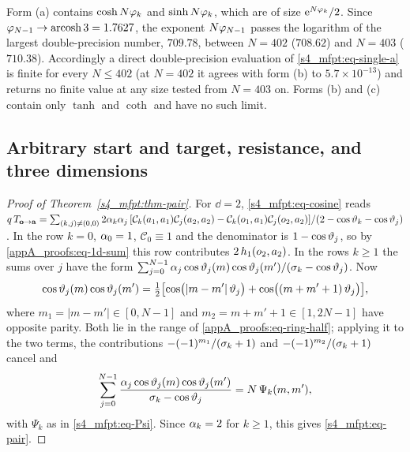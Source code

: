 \begin{remark}
Form (a) contains $\cosh N\varphi_{k}$ and $\sinh N\varphi_{k}$, which are of size $\mathrm{e}^{N\varphi_{k}}/2$. Since
$\varphi_{N-1}\to\operatorname{arcosh}3=1.7627$, the exponent $N\varphi_{N-1}$ passes the logarithm of the largest double-precision
number, $709.78$, between $N=402$ ($708.62$) and $N=403$ ($710.38$). Accordingly a direct double-precision
evaluation of \eqref{s4_mfpt:eq-single-a} is finite for every $N\le402$ (at $N=402$ it agrees with form (b) to
$5.7\times10^{-13}$) and returns no finite value at any size tested from $N=403$ on.
Forms (b) and (c) contain only $\tanh$ and $\coth$ and have no such limit.
\end{remark}

\subsection{Arbitrary start and target, resistance, and three dimensions}

\begin{proof}[Proof of Theorem~\ref{s4_mfpt:thm-pair}]
For $\dd=2$, \eqref{s4_mfpt:eq-cosine} reads
$q\,T_{\mathbf{o}\to\mathbf{a}}=\sum_{(k,j)\ne(0,0)}2\alpha_{k}\alpha_{j}\,[\mathcal C_k(a_1,a_1)\mathcal C_j(a_2,a_2)-\mathcal C_k(o_1,a_1)\mathcal C_j(o_2,a_2)]/(2-\cos\vartheta_{k}-\cos\vartheta_{j})$.
In the row $k=0$, $\alpha_{0}=1$, $\mathcal C_0\equiv1$ and the denominator is $1-\cos\vartheta_{j}$, so by
\eqref{appA_proofs:eq-1d-sum} this row contributes $2\,h_{1}(o_2,a_2)$. In the rows $k\ge1$ the sums over $j$ have
the form $\sum_{j=0}^{N-1}\alpha_{j}\cos\vartheta_{j}(m)\cos\vartheta_{j}(m')/(\sigma_{k}-\cos\vartheta_{j})$. Now
\begin{equation}\label{appA_proofs:eq-prod}
  \cos\vartheta_{j}(m)\cos\vartheta_{j}(m')=\tfrac12\bigl[\cos\bigl(|m-m'|\,\vartheta_{j}\bigr)+\cos\bigl((m+m'+1)\,\vartheta_{j}\bigr)\bigr],
\end{equation}
where $m_1=|m-m'|\in[0,N-1]$ and $m_2=m+m'+1\in[1,2N-1]$ have opposite parity. Both lie in the range of
\eqref{appA_proofs:eq-ring-half}; applying it to the two terms, the contributions $-(-1)^{m_1}/(\sigma_{k}+1)$ and
$-(-1)^{m_2}/(\sigma_{k}+1)$ cancel and
\begin{equation}\label{appA_proofs:eq-inner-pair}
  \sum_{j=0}^{N-1}\frac{\alpha_{j}\cos\vartheta_{j}(m)\cos\vartheta_{j}(m')}{\sigma_{k}-\cos\vartheta_{j}}=N\,\Psi_k(m,m'),
\end{equation}
with $\Psi_k$ as in \eqref{s4_mfpt:eq-Psi}. Since $\alpha_{k}=2$ for $k\ge1$, this gives \eqref{s4_mfpt:eq-pair}.
\end{proof}

